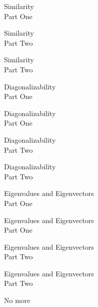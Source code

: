 \documentclass{titlescreen}
\begin{document}
\begin{videotitle}
  Similarity \\[1ex]
  Part One
\end{videotitle}
\begin{videoend}
  Similarity \\[1ex]
  Part Two
\end{videoend}

\begin{videotitle}
  Similarity \\[1ex]
  Part Two
\end{videotitle}
\begin{videoend}
  Diagonalizability \\[1ex]
  Part One
\end{videoend}

\begin{videotitle}
  Diagonalizability \\[1ex]
  Part One
\end{videotitle}
\begin{videoend}
  Diagonalizability \\[1ex]
  Part Two
\end{videoend}

\begin{videotitle}
  Diagonalizability \\[1ex]
  Part Two
\end{videotitle}
\begin{videoend}
  Eigenvalues and Eigenvectors \\[1ex]
  Part One
\end{videoend}

\begin{videotitle}
  Eigenvalues and Eigenvectors \\[1ex]
  Part One
\end{videotitle}
\begin{videoend}
  Eigenvalues and Eigenvectors \\[1ex]
  Part Two
\end{videoend}

\begin{videotitle}
  Eigenvalues and Eigenvectors \\[1ex]
  Part Two
\end{videotitle}
\begin{videoend}
  No more
\end{videoend}





\end{document}
